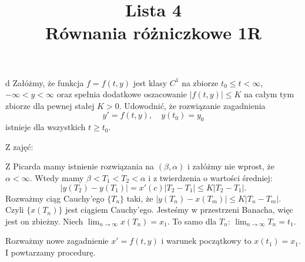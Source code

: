 \documentclass{article}
\title{Lista 4\\{\normalsize Równania różniczkowe 1R}}
\author{}
\date{}
\begin{document}
\maketitle
\thispagestyle{empty}

\begin{problem}{d}
Załóżmy, że funkcja $f=f(t,y)$ jest klasy $C^1$ na zbiorze $t_0\leq t<\infty$, $-\infty<y<\infty$ oraz spełnia dodatkowe oszacowanie $|f(t,y)|\leq K$ na całym tym zbiorze dla pewnej stałej $K>0$. Udowodnić, że rozwiązanie zagadnienia
$$y'=f(t,y),\quad y(t_0)=y_0$$
istnieje dla wszystkich $t\geq t_0$.
\end{problem}

Z zajęć:

Z Picarda mamy istnienie rozwiązania na $(\beta, \alpha)$ i załóżmy nie wprost, że $\alpha<\infty$. Wtedy mamy $\beta<T_1<T_2<\alpha$ i z twierdzenia o wartości średniej:
$$|y(T_2)-y(T_1)|=x'(c)|T_2-T_1|\leq K|T_2-T_1|.$$
Rozważmy ciąg Cauchy'ego $\{T_n\}$ taki, że $|y(T_n)-x(T_m)|\leq K|T_n-T_m|$. Czyli $\{x(T_n)\}$ jest ciągiem Cauchy'ego. Jesteśmy w przestrzeni Banacha, więc jest on zbieżny. Niech $\lim_{n\to\infty}x(T_n)=x_1$. To samo dla $T_n$: $\lim_{n\to\infty}T_n=t_1$.

Rozważmy nowe zagadnienie $x'=f(t,y)$ i warunek początkowy to $x(t_1)=x_1$. I powtarzamy procedurę.



%

%
%
\end{document}
